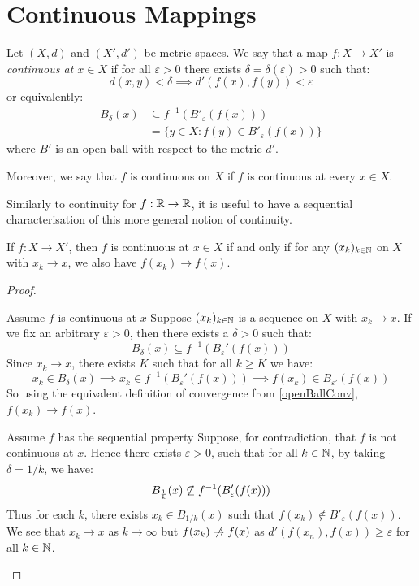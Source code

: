 \documentclass[../main.tex]{subfiles}
\begin{document}
\section{Continuous Mappings}
\begin{definition}
  Let $(X, d)$ and $(X', d')$ be metric spaces.
  We say that a map $f: X \to X'$ is \textit{continuous at $x \in X$} if for all $\varepsilon > 0$ there exists $\delta = \delta(\varepsilon) > 0$ such that:
  \[
    d(x, y) < \delta \implies d'(f(x), f(y)) < \varepsilon
  \]
  or equivalently:
  \begin{align*}
    B_{\delta}(x) &\subseteq f^{-1}(B'_{\varepsilon}(f(x))) \\
                  &= \{y \in X: f(y) \in B'_\varepsilon(f(x))\}
  \end{align*}
  where $B'$ is an open ball with respect to the metric $d'$.

  Moreover, we say that $f$ is continuous on $X$ if $f$ is continuous at every $x \in X$.
\end{definition}
Similarly to continuity for $f: \mathbb{R} \to \mathbb{R}$, it is useful to have a sequential characterisation of this more general notion of continuity.
\begin{theorem}
  If $f: X \to X'$, then $f$ is continuous at $x \in X$ if and only if for any $(x_k)_{k \in \mathbb{N}}$ on $X$ with $x_k \to x$, we also have $f(x_k) \to f(x)$. \label{contSeq}
\end{theorem}
\begin{proof}
  \begin{proofdirection}{Assume $f$ is continuous at $x$}
    Suppose $(x_k)_{k \in \mathbb{N}}$ is a sequence on $X$ with $x_k \to x$.
    If we fix an arbitrary $\varepsilon > 0$, then there exists a $\delta > 0$ such that:
    \[
      B_{\delta}(x) \subseteq f^{-1}(B_{\varepsilon}'(f(x)))
    \]
    Since $x_k \to x$, there exists $K$ such that for all $k \geq K$ we have:
    \[
      x_k \in B_\delta(x) \implies x_k \in f^{-1}(B_{\varepsilon}'(f(x))) \implies f(x_k) \in B_{\varepsilon'}(f(x))
    \]
    So using the equivalent definition of convergence from \cref{openBallConv}, $f(x_k) \to f(x)$.
  \end{proofdirection}
  \begin{proofdirection}{Assume $f$ has the sequential property}
    Suppose, for contradiction, that $f$ is not continuous at $x$.
    Hence there exists $\varepsilon > 0$, such that for all $k \in \mathbb{N}$, by taking $\delta = 1/k$, we have:
    \[
      B_{\frac{1}{k}}(x) \centernot\subseteq f^{-1}(B'_\varepsilon(f(x)))
    \]
    Thus for each $k$, there exists $x_k \in B_{1/k}(x)$ such that $f(x_k) \notin B'_\varepsilon(f(x))$.
    We see that $x_k \to x$ as $k \to \infty$ but $f(x_k) \centernot\to f(x)$ as $d'(f(x_n), f(x)) \geq \varepsilon$ for all $k \in \mathbb{N}$.
  \end{proofdirection}
\end{proof}
\end{document}
